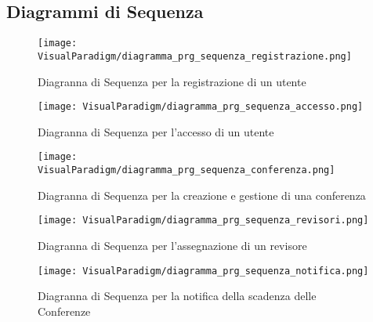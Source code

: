 \subsection{Diagrammi di Sequenza}
\label{sec:diagrammi_di_sequenza}
\begin{figure}[ht]
  \centering
  \texttt{[image: VisualParadigm/diagramma\_prg\_sequenza\_registrazione.png]}
  \caption{Diagranna di Sequenza per la registrazione di un utente}
  \label{fig:prg_sequenza_registrazione}
\end{figure}

\begin{figure}[ht]
  \centering
  \texttt{[image: VisualParadigm/diagramma\_prg\_sequenza\_accesso.png]}
  \caption{Diagranna di Sequenza per l'accesso di un utente}
  \label{fig:prg_sequenza_accesso}
\end{figure}

\begin{figure}[ht]
  \centering
  \texttt{[image: VisualParadigm/diagramma\_prg\_sequenza\_conferenza.png]}
  \caption{Diagranna di Sequenza per la creazione e gestione di una conferenza}
  \label{fig:prg_sequenza_conferenza}
\end{figure}

\begin{figure}[ht]
  \centering
  \texttt{[image: VisualParadigm/diagramma\_prg\_sequenza\_revisori.png]}
  \caption{Diagranna di Sequenza per l'assegnazione di un revisore}
  \label{fig:prg_sequenza_assegnazione}
\end{figure}

\begin{figure}[ht]
  \centering
  \texttt{[image: VisualParadigm/diagramma\_prg\_sequenza\_notifica.png]}
  \caption{Diagranna di Sequenza per la notifica della scadenza delle Conferenze}
  \label{fig:prg_sequenza_notifica}
\end{figure}

